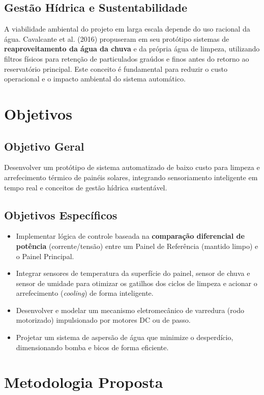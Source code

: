 \documentclass[12pt, a4paper]{article}
\begin{document}
\subsection{Gestão Hídrica e Sustentabilidade}
A viabilidade ambiental do projeto em larga escala depende do uso racional da água. Cavalcante et al. (2016) \cite{cavalcante2016} propuseram em seu protótipo sistemas de \textbf{reaproveitamento da água da chuva} e da própria água de limpeza, utilizando filtros físicos para retenção de particulados graúdos e finos antes do retorno ao reservatório principal. Este conceito é fundamental para reduzir o custo operacional e o impacto ambiental do sistema automático.

\section{Objetivos}

\subsection{Objetivo Geral}
Desenvolver um protótipo de sistema automatizado de baixo custo para limpeza e arrefecimento térmico de painéis solares, integrando sensoriamento inteligente em tempo real e conceitos de gestão hídrica sustentável.

\subsection{Objetivos Específicos}
\begin{itemize}
    \item Implementar lógica de controle baseada na \textbf{comparação diferencial de potência} (corrente/tensão) entre um Painel de Referência (mantido limpo) e o Painel Principal.
    \item Integrar sensores de temperatura da superfície do painel, sensor de chuva e sensor de umidade para otimizar os gatilhos dos ciclos de limpeza e acionar o arrefecimento (\textit{cooling}) de forma inteligente.
    \item Desenvolver e modelar um mecanismo eletromecânico de varredura (rodo motorizado) impulsionado por motores DC ou de passo.
    \item Projetar um sistema de aspersão de água que minimize o desperdício, dimensionando bomba e bicos de forma eficiente.
\end{itemize}

\section{Metodologia Proposta}
\end{document}
